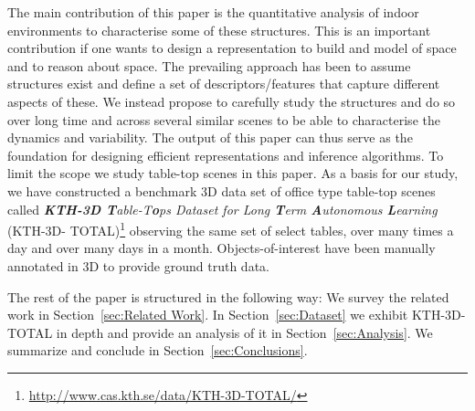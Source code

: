 \documentclass[letterpaper, 10 pt, conference]{ieeeconf}  %
\begin{document}
The main contribution of this paper is the quantitative analysis of
indoor environments to characterise some of these structures. This is
an important contribution if one wants to design a representation to
build and model of space and to reason about space.  The prevailing
approach has been to assume structures exist and define a set of
descriptors/features that capture different aspects of these. We
instead propose to carefully study the structures and do so over long
time and across several similar scenes to be able to characterise the
dynamics and variability. The output of this paper can thus serve as
the foundation for designing efficient representations and inference
algorithms. To limit the scope we study table-top scenes in this
paper. As a basis for our study, we have constructed a benchmark 3D
data set of office type table-top scenes called \textit{\textbf{KTH-3D
    T}able-T\textbf{o}ps Dataset for Long \textbf{T}erm
  \textbf{A}utonomous \textbf{L}earning} (KTH-3D-
TOTAL)\footnote{\url{http://www.cas.kth.se/data/KTH-3D-TOTAL/}} observing
the same set of select tables, over many times a day and over many
days in a month. Objects-of-interest have been manually annotated in
3D to provide ground truth data.

The rest of the paper is structured in the following way: We survey the related work in Section~\ref{sec:Related Work}. In Section~\ref{sec:Dataset} we exhibit KTH-3D-TOTAL in depth and provide an 
analysis of it in Section~\ref{sec:Analysis}. We summarize and conclude in Section~\ref{sec:Conclusions}.


\end{document}

